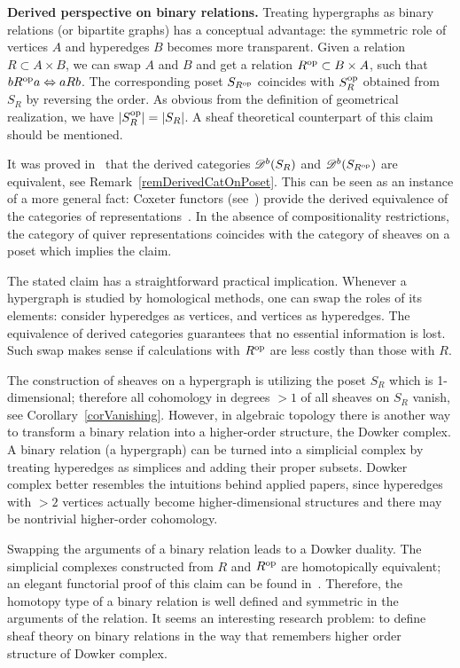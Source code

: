 \textbf{Derived perspective on binary relations.} Treating hypergraphs as binary relations (or bipartite graphs) has a conceptual advantage: the symmetric role of vertices $A$ and hyperedges $B$ becomes more transparent. Given a relation $R\subset A\times B$, we can swap $A$ and $B$ and get a relation $R^{\operatorname{op}}\subset B\times A$, such that $bR^{\operatorname{op}}a\Leftrightarrow aRb$. The corresponding poset $S_{R^{\operatorname{op}}}$ coincides with $S_R^{\operatorname{op}}$ obtained from $S_R$ by reversing the order. As obvious from the definition of geometrical realization, we have $|S_R^{\operatorname{op}}|=|S_R|$. A sheaf theoretical counterpart of this claim should be mentioned.

\begin{rem}\label{remDerivedOpposite}
It was proved in~\cite[Cor.4.18]{LADKANI2008435} that the derived categories $\mathscr{D}^b(S_R)$ and $\mathscr{D}^b(S_{R^{\operatorname{op}}})$ are equivalent, see Remark~\ref{remDerivedCatOnPoset}. This can be seen as an instance of a more general fact: Coxeter functors (see~\cite{BernGelfPonomarev}) provide the derived equivalence of the categories of representations~\cite[Thm.3.19]{Longbottom}. In the absence of compositionality restrictions, the category of quiver representations coincides with the category of sheaves on a poset which implies the claim.

The stated claim has a straightforward practical implication. Whenever a hypergraph is studied by homological methods, one can swap the roles of its elements: consider hyperedges as vertices, and vertices as hyperedges. The equivalence of derived categories guarantees that no essential information is lost. Such swap makes sense if calculations with $R^{\operatorname{op}}$ are less costly than those with $R$.    
\end{rem}

\begin{con}\label{conDowker}
The construction of sheaves on a hypergraph is utilizing the poset $S_R$ which is 1-dimensional; therefore all cohomology in degrees $>1$ of all sheaves on $S_R$ vanish, see Corollary~\ref{corVanishing}. However, in algebraic topology there is another way to transform a binary relation into a higher-order structure, the Dowker complex. A binary relation (a hypergraph) can be turned into a simplicial complex by treating hyperedges as simplices and adding their proper subsets. Dowker complex better resembles the intuitions behind applied papers, since hyperedges with $>2$ vertices actually become higher-dimensional structures and there may be nontrivial higher-order cohomology. 

Swapping the arguments of a binary relation leads to a Dowker duality. The simplicial complexes constructed from $R$ and $R^{\operatorname{op}}$ are homotopically equivalent; an elegant functorial proof of this claim can be found in~\cite{BrunSalbu}. Therefore, the homotopy type of a binary relation is well defined and symmetric in the arguments of the relation. It seems an interesting research problem: to define sheaf theory on binary relations in the way that remembers higher order structure of Dowker complex. 
\end{con}


